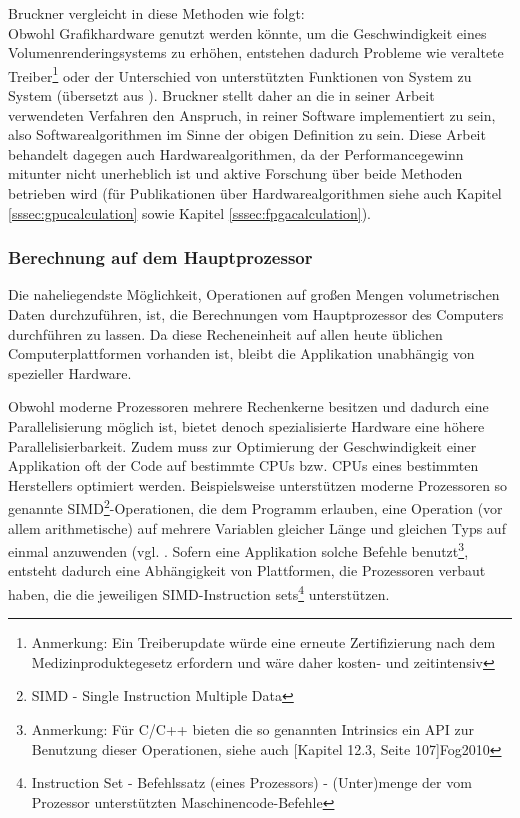 \documentclass[a4paper,titlepage,12pt]{scrartcl}
\newtheorem[L]{boxedDefinition}{Definition}
\begin{document}
Bruckner vergleicht in \cite{Bru08} diese Methoden wie folgt:\\
Obwohl Grafikhardware genutzt werden könnte, um die Geschwindigkeit eines Volumenrenderingsystems zu erhöhen, entstehen dadurch Probleme wie veraltete Treiber\footnote{Anmerkung: Ein Treiberupdate würde eine erneute Zertifizierung nach dem Medizinproduktegesetz erfordern und wäre daher kosten- und zeitintensiv} oder der Unterschied von unterstützten Funktionen von System zu System (übersetzt aus \cite[Kapitel 3.1.1, Seite 17, Paragraph \glqq Pure Software \grqq]{Bruckner2004}).
Bruckner stellt daher an die in seiner Arbeit verwendeten Verfahren den Anspruch, in reiner Software implementiert zu sein, also Softwarealgorithmen im Sinne der obigen Definition zu sein. Diese Arbeit behandelt dagegen auch Hardwarealgorithmen, da der Performancegewinn mitunter nicht unerheblich ist und aktive Forschung über beide Methoden betrieben wird (für Publikationen über Hardwarealgorithmen siehe auch Kapitel \ref{sssec:gpucalculation} sowie Kapitel \ref{sssec:fpgacalculation}).

\subsubsection{Berechnung auf dem Hauptprozessor}\label{sssec:cpucalculation}
Die naheliegendste Möglichkeit, Operationen auf großen Mengen volumetrischen Daten durchzuführen, ist, die Berechnungen vom Hauptprozessor des Computers durchführen zu lassen. Da diese Recheneinheit auf allen heute üblichen Computerplattformen vorhanden ist, bleibt die Applikation unabhängig von spezieller Hardware.

Obwohl moderne Prozessoren mehrere Rechenkerne besitzen und dadurch eine Parallelisierung möglich ist, bietet denoch spezialisierte Hardware eine höhere Parallelisierbarkeit. Zudem muss zur Optimierung der Geschwindigkeit einer Applikation oft der Code auf bestimmte CPUs bzw. CPUs eines bestimmten Herstellers optimiert werden. Beispielsweise unterstützen moderne Prozessoren so genannte SIMD\footnote{SIMD - Single Instruction Multiple Data}-Operationen, die dem Programm erlauben, eine Operation (vor allem arithmetische) auf mehrere Variablen gleicher Länge und gleichen Typs auf einmal anzuwenden (vgl. \cite[Kapitel 12, Seite 103]{Fog2010}. Sofern eine Applikation solche Befehle benutzt\footnote{Anmerkung: Für C/C++ bieten die so genannten Intrinsics ein API zur Benutzung dieser Operationen, siehe auch [Kapitel 12.3, Seite 107]{Fog2010}}, entsteht dadurch eine Abhängigkeit von Plattformen, die Prozessoren verbaut haben, die die jeweiligen SIMD-Instruction sets\footnote{Instruction Set - Befehlssatz (eines Prozessors) - (Unter)menge der vom Prozessor unterstützten Maschinencode-Befehle} unterstützen.
\end{document}

